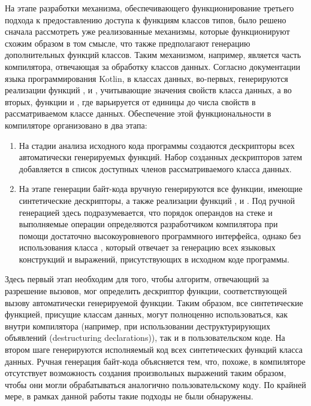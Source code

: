 На этапе разработки механизма, обеспечивающего функционирование третьего подхода к предоставлению доступа к функциям классов типов, было решено сначала рассмотреть уже реализованные механизмы, которые функционируют схожим образом в том смысле, что также предполагают генерацию дополнительных функций классов. Таким механизмом, например, является часть компилятора, отвечающая за обработку классов данных. Согласно документации языка программирования Kotlin, в классах данных, во-первых, генерируются реализации функций ,  и , учитывающие значения свойств класса данных, а во вторых, функции  и , где  варьируется от единицы до числа свойств в рассматриваемом классе данных. Обеспечение этой функциональности в компиляторе организовано в два этапа:
\begin{enumerate}
    \item На стадии анализа исходного кода программы создаются дескрипторы всех автоматически генерируемых функций. Набор созданных дескрипторов затем добавляется в список доступных членов рассматриваемого класса данных. 
    \item На этапе генерации байт-кода вручную генерируются все функции, имеющие синтетические дескрипторы, а также реализации функций ,  и . Под ручной генерацией здесь подразумевается, что порядок операндов на стеке и выполняемые операции определяются разработчиком компилятора при помощи достаточно высокоуровневого программного интерфейса, однако без использования класса , который отвечает за генерацию всех языковых конструкций и выражений, присутствующих в исходном коде программы.   
\end{enumerate}
Здесь первый этап необходим для того, чтобы алгоритм, отвечающий за разрешение вызовов, мог определить дескриптор функции, соответствующей вызову автоматически генерируемой функции. Таким образом, все синтетические функцией, присущие классам данных, могут полноценно использоваться, как внутри компилятора (например, при использовании деструктурирующих объявлений (destructuring declarations)), так и в пользовательском коде. На втором шаге генерируются исполняемый код всех синтетических функций класса данных. Ручная генерация байт-кода объясняется тем, что, похоже, в компиляторе отсутствует возможность создания произвольных выражений таким образом, чтобы они могли обрабатываться аналогично пользовательскому коду. По крайней мере, в рамках данной работы такие подходы не были обнаружены. 

